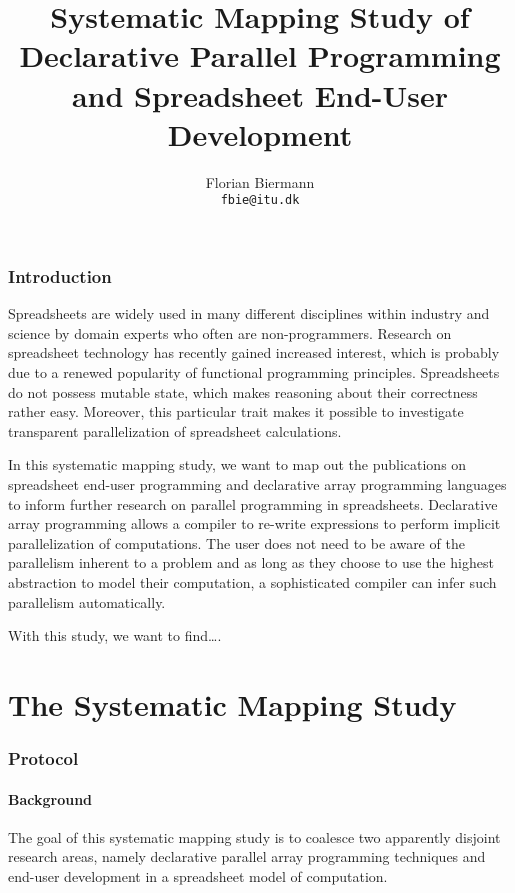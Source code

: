 \documentclass[a4paper]{article}
\title{Systematic Mapping Study of Declarative Parallel Programming
  and Spreadsheet End-User Development}
\author{Florian Biermann\\\small{\texttt{fbie@itu.dk}}}
\begin{document}
\maketitle

\section{Introduction}
\label{sec:intro}

Spreadsheets are widely used in many different disciplines within
industry and science by domain experts who often are
non-programmers. Research on spreadsheet
technology has recently gained increased interest, which is probably
due to a renewed popularity of functional programming
principles. Spreadsheets do not possess mutable state, which makes
reasoning about their correctness rather easy. Moreover, this
particular trait makes it possible to investigate transparent
parallelization of spreadsheet calculations.

In this systematic mapping study, we want to map out the publications
on spreadsheet end-user programming and declarative array programming
languages to inform further research on parallel programming in
spreadsheets. Declarative array programming allows a compiler to
re-write expressions to perform implicit parallelization of
computations. The user does not need to be aware of the parallelism
inherent to a problem and as long as they choose to use the highest
abstraction to model their computation, a sophisticated compiler can
infer such parallelism automatically.

With this study, we want to find\dots.

\newpage{}
\part{The Systematic Mapping Study}
\label{part:syst-mapp-study}

\section{Protocol}
\label{sec:protocol}

\subsection{Background}
\label{sec:background}

The goal of this systematic mapping study is to coalesce two
apparently disjoint research areas, namely declarative parallel array
programming techniques and end-user development in a spreadsheet model
of computation.
\end{document}
